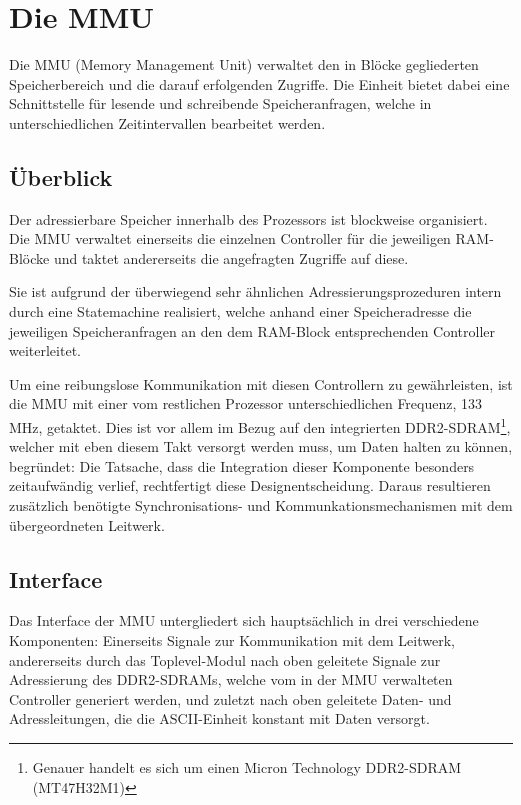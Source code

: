\chapter{Die MMU}

Die MMU (Memory Management Unit) verwaltet den in Bl\"ocke gegliederten Speicherbereich und die darauf erfolgenden Zugriffe. Die Einheit bietet dabei eine Schnittstelle für lesende und schreibende Speicheranfragen, welche in unterschiedlichen Zeitintervallen bearbeitet werden.

\section{\"Uberblick}

Der adressierbare Speicher innerhalb des Prozessors ist blockweise organisiert. Die MMU verwaltet einerseits die einzelnen Controller für die jeweiligen RAM-Bl\"ocke und taktet andererseits die angefragten Zugriffe auf diese.

Sie ist aufgrund der \"uberwiegend sehr \"ahnlichen Adressierungsprozeduren intern durch eine Statemachine realisiert, welche anhand einer Speicheradresse die jeweiligen Speicheranfragen an den dem RAM-Block entsprechenden Controller weiterleitet.

Um eine reibungslose Kommunikation mit diesen Controllern zu gew\"ahrleisten, ist die MMU mit einer vom restlichen Prozessor unterschiedlichen Frequenz, 133 MHz, getaktet. Dies ist vor allem im Bezug auf den integrierten DDR2-SDRAM\footnote{Genauer handelt es sich um einen Micron Technology DDR2-SDRAM (MT47H32M1)}, welcher mit eben diesem Takt versorgt werden muss, um Daten halten zu k\"onnen, begr\"undet: Die Tatsache, dass die Integration dieser Komponente besonders zeitaufw\"andig verlief, rechtfertigt diese Designentscheidung. Daraus resultieren zus\"atzlich ben\"otigte Synchronisations- und Kommunkationsmechanismen mit dem \"ubergeordneten Leitwerk.
\newpage
\section{Interface}
Das Interface der MMU untergliedert sich haupts\"achlich in drei verschiedene Komponenten: Einerseits Signale zur Kommunikation mit dem Leitwerk, andererseits durch das Toplevel-Modul nach oben geleitete Signale zur Adressierung des DDR2-SDRAMs, welche vom in der MMU verwalteten Controller generiert werden, und zuletzt nach oben geleitete Daten- und Adressleitungen, die die ASCII-Einheit konstant mit Daten versorgt.

